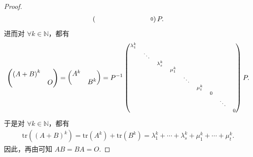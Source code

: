 \documentclass[../../main.tex]{subfiles}%
\begin{document}
\begin{proof}
\begin{align*}
\begin{scriptsize}
\begin{pmatrix}
&		&		&		&		&		&		&		&		0\\
\end{pmatrix}\end{scriptsize} P.
\end{align*}
进而对 $\forall k\in \mathbb{N}$，都有
\begin{align*}
\begin{pmatrix}
\left( A+B \right) ^k&		\\
&		O\\
\end{pmatrix} =\begin{pmatrix}
A^k&				\\
&		B^k		\\
\end{pmatrix} =P^{-1}\begin{scriptsize}\begin{pmatrix}
\lambda _{1}^{k}&		&		&		&		&		&		&		&		\\
&		\ddots&		&		&		&		&		&		&		\\
&		&		\lambda _{s}^{k}&		&		&		&		&		&		\\
&		&		&		\mu _{1}^{k}&		&		&		&		&		\\
&		&		&		&		\ddots&		&		&		&		\\
&		&		&		&		&		\mu _{t}^{k}&		&		&		\\
&		&		&		&		&		&		0&		&		\\
&		&		&		&		&		&		&		\ddots&		\\
&		&		&		&		&		&		&		&		0\\
\end{pmatrix}\end{scriptsize} P.
\end{align*}
于是对 $\forall k\in \mathbb{N}$，都有
\begin{align*}
\mathrm{tr}\left( \left( A+B \right) ^k \right) =\mathrm{tr}\left( A^k \right) +\mathrm{tr}\left( B^k \right) =\lambda _{1}^{k}+\cdots +\lambda _{s}^{k}+\mu _{1}^{k}+\cdots +\mu _{t}^{k}.
\end{align*}
因此，再由可知 $AB=BA=O$.


\end{proof}
\end{document}
